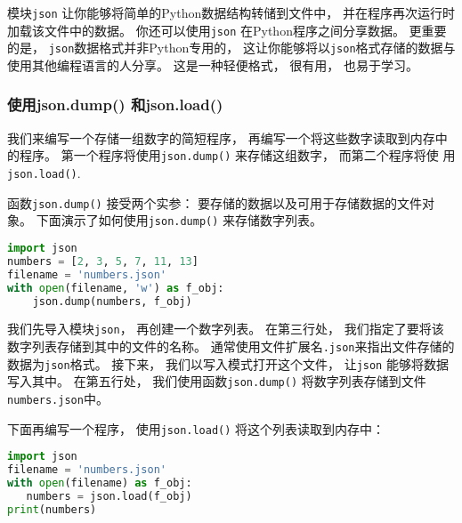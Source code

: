 模块\verb|json| 让你能够将简单的Python数据结构转储到文件中， 并在程序再次运行时加载该文件中的数据。 你还可以使用\verb|json| 在Python程序之间分享数据。 更重要的是， \verb|json|数据格式并非Python专用的， 这让你能够将以\verb|json|格式存储的数据与使用其他编程语言的人分享。 这是一种轻便格式， 很有用， 也易于学习。

\subsubsection{使用json.dump() 和json.load()}
我们来编写一个存储一组数字的简短程序， 再编写一个将这些数字读取到内存中的程序。 第一个程序将使用\verb|json.dump()| 来存储这组数字， 而第二个程序将使
用\verb|json.load()|.

函数\verb|json.dump()| 接受两个实参： 要存储的数据以及可用于存储数据的文件对象。 下面演示了如何使用\verb|json.dump()| 来存储数字列表。
\begin{lstlisting}[language=python]
import json
numbers = [2, 3, 5, 7, 11, 13]
filename = 'numbers.json'
with open(filename, 'w') as f_obj:
    json.dump(numbers, f_obj)
\end{lstlisting}
我们先导入模块\verb|json|， 再创建一个数字列表。 在第三行处， 我们指定了要将该数字列表存储到其中的文件的名称。 通常使用文件扩展名\verb|.json|来指出文件存储的数据为\verb|json|格式。 接下来， 我们以写入模式打开这个文件， 让\verb|json| 能够将数据写入其中。 在第五行处， 我们使用函数\verb|json.dump()| 将数字列表存储到文件\verb|numbers.json|中。

下面再编写一个程序， 使用\verb|json.load()| 将这个列表读取到内存中：

\begin{lstlisting}[language=python]
import json
filename = 'numbers.json'
with open(filename) as f_obj:
   numbers = json.load(f_obj)
print(numbers)
\end{lstlisting}
